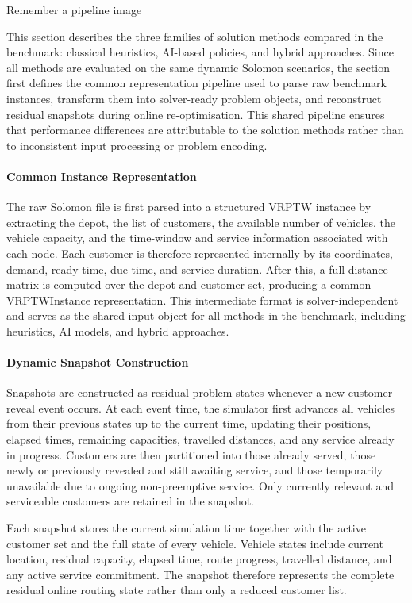 {\color{red} Remember a pipeline image}

This section describes the three families of solution methods compared in the
benchmark: classical heuristics, AI-based policies, and hybrid approaches. Since
all methods are evaluated on the same dynamic Solomon scenarios, the section
first defines the common representation pipeline used to parse raw benchmark
instances, transform them into solver-ready problem objects, and reconstruct
residual snapshots during online re-optimisation. This shared pipeline ensures
that performance differences are attributable to the solution methods rather
than to inconsistent input processing or problem encoding.

\paragraph{Common Instance Representation}
The raw Solomon file is first parsed into a structured VRPTW instance by
extracting the depot, the list of customers, the available number of vehicles,
the vehicle capacity, and the time-window and service information associated
with each node. Each customer is therefore represented internally by its
coordinates, demand, ready time, due time, and service duration. After this, a
full distance matrix is computed over the depot and customer set, producing a
common VRPTWInstance representation. This intermediate format is
solver-independent and serves as the shared input object for all methods in the
benchmark, including heuristics, AI models, and hybrid approaches.

\paragraph{Dynamic Snapshot Construction}
Snapshots are constructed as residual problem states whenever a new customer
reveal event occurs. At each event time, the simulator first advances all
vehicles from their previous states up to the current time, updating their
positions, elapsed times, remaining capacities, travelled distances, and any
service already in progress. Customers are then partitioned into those already
served, those newly or previously revealed and still awaiting service, and those
temporarily unavailable due to ongoing non-preemptive service. Only currently
relevant and serviceable customers are retained in the snapshot.

Each snapshot stores the current simulation time together with the active
customer set and the full state of every vehicle. Vehicle states include current
location, residual capacity, elapsed time, route progress, travelled distance,
and any active service commitment. The snapshot therefore represents the
complete residual online routing state rather than only a reduced customer list.

